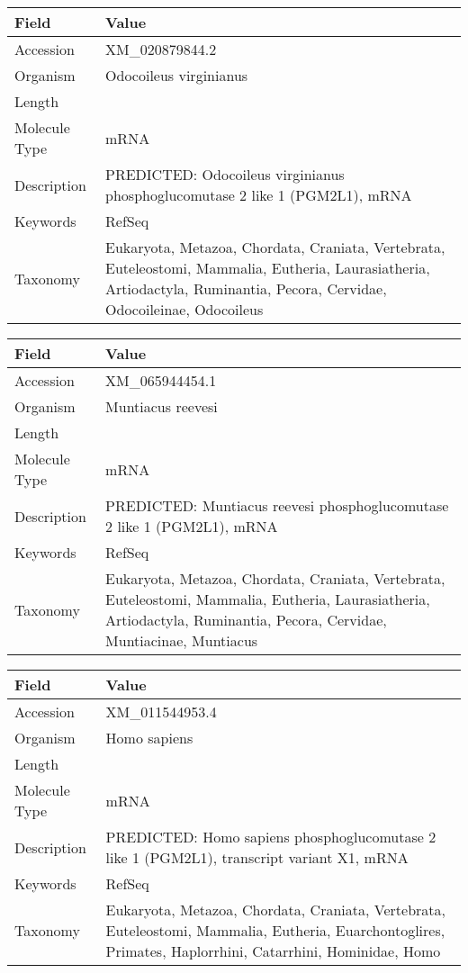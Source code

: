 \documentclass[10pt]{article}
\begin{document}
{\footnotesize
\begin{longtable}{>{\raggedright\arraybackslash}p{4.5cm} >{\raggedright\arraybackslash}p{11.5cm}}
\textbf{Field} & \textbf{Value} \\
\hline
Accession & XM\_020879844.2 \\
Organism & Odocoileus virginianus \\
Length & 7622 \\
Molecule Type & mRNA \\
Description & PREDICTED: Odocoileus virginianus phosphoglucomutase 2 like 1 (PGM2L1), mRNA \\
Keywords & RefSeq \\
Taxonomy & Eukaryota, Metazoa, Chordata, Craniata, Vertebrata, Euteleostomi, Mammalia, Eutheria, Laurasiatheria, Artiodactyla, Ruminantia, Pecora, Cervidae, Odocoileinae, Odocoileus \\
\end{longtable}
}

{\footnotesize
\begin{longtable}{>{\raggedright\arraybackslash}p{4.5cm} >{\raggedright\arraybackslash}p{11.5cm}}
\textbf{Field} & \textbf{Value} \\
\hline
Accession & XM\_065944454.1 \\
Organism & Muntiacus reevesi \\
Length & 7522 \\
Molecule Type & mRNA \\
Description & PREDICTED: Muntiacus reevesi phosphoglucomutase 2 like 1 (PGM2L1), mRNA \\
Keywords & RefSeq \\
Taxonomy & Eukaryota, Metazoa, Chordata, Craniata, Vertebrata, Euteleostomi, Mammalia, Eutheria, Laurasiatheria, Artiodactyla, Ruminantia, Pecora, Cervidae, Muntiacinae, Muntiacus \\
\end{longtable}
}

{\footnotesize
\begin{longtable}{>{\raggedright\arraybackslash}p{4.5cm} >{\raggedright\arraybackslash}p{11.5cm}}
\textbf{Field} & \textbf{Value} \\
\hline
Accession & XM\_011544953.4 \\
Organism & Homo sapiens \\
Length & 8540 \\
Molecule Type & mRNA \\
Description & PREDICTED: Homo sapiens phosphoglucomutase 2 like 1 (PGM2L1), transcript variant X1, mRNA \\
Keywords & RefSeq \\
Taxonomy & Eukaryota, Metazoa, Chordata, Craniata, Vertebrata, Euteleostomi, Mammalia, Eutheria, Euarchontoglires, Primates, Haplorrhini, Catarrhini, Hominidae, Homo \\
\end{longtable}
}
\end{document}
